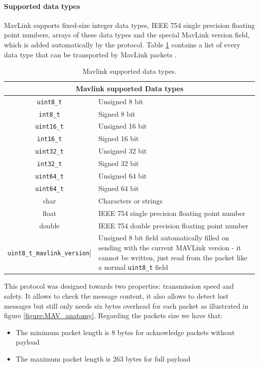 \paragraph{Supported data types}
MavLink supports fixed-size integer data types, IEEE 754 single precision floating point numbers, arrays of these data types and the special MavLink version field, which is added automatically by the protocol. Table \ref{tab:mavlink} contains a list of every data type that can be transported by MavLink packets \cite{MAVLink}.\par
\begin{table}
\centering
\begin{tabular}{c | p{6cm}}
\multicolumn{2}{c}{\large Mavlink supported Data types}\\
\hline
 \texttt{uint8\_t} &  Unsigned 8 bit\\
 \texttt{int8\_t} & Signed 8 bit\\
 \texttt{uint16\_t} &  Unsigned 16 bit\\
 \texttt{int16\_t} & Signed 16 bit\\
 \texttt{uint32\_t} & Unsigned 32 bit\\
 \texttt{int32\_t} & Signed 32 bit \\
 \texttt{uint64\_t} & Unsigned 64 bit \\
 \texttt{uint64\_t} &  Signed 64 bit \\
 \hline
 char & Characters or strings\\
 float & IEEE 754 single precision floating point number\\
 double & IEEE 754 double precision floating point number\\
 \hline
 \texttt{uint8\_t\_mavlink\_version}] & Unsigned 8 bit field automatically filled on sending with the current MAVLink version - it cannot be written, just read from the packet like a normal \texttt{uint8\_t} field
\end{tabular}
\caption[Mavlink types]{Mavlink supported data types.}
\label{tab:mavlink}
\end{table}
This protocol was designed towards two properties: transmission speed and safety. It allows to check the message content, it also allows to detect lost messages but still only needs six bytes overhead for each packet as illustrated in figure \ref{figure:MAV_anatomy}. Regarding the packets size we have that:

\begin{itemize}
\item The minimum packet length is 8 bytes for acknowledge packets without payload
\item The maximum packet length is 263 bytes for full payload
\end{itemize}

